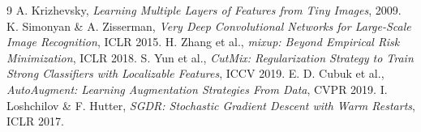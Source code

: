 \documentclass[10pt,conference]{article}
\begin{document}
\begin{thebibliography}{9}
 A. Krizhevsky, \emph{Learning Multiple
  Layers of Features from Tiny Images}, 2009.
    K. Simonyan \& A. Zisserman,
  \emph{Very Deep Convolutional Networks for Large-Scale Image
  Recognition}, ICLR 2015.
     H. Zhang et al., \emph{mixup: Beyond
  Empirical Risk Minimization}, ICLR 2018.
      S. Yun et al., \emph{CutMix: Regularization
  Strategy to Train Strong Classifiers with Localizable Features},
  ICCV 2019.
 E. D. Cubuk et al.,
  \emph{AutoAugment: Learning Augmentation Strategies From Data},
  CVPR 2019.
 I. Loshchilov \& F. Hutter,
  \emph{SGDR: Stochastic Gradient Descent with Warm Restarts},
  ICLR 2017.
\end{thebibliography}
\end{document}
